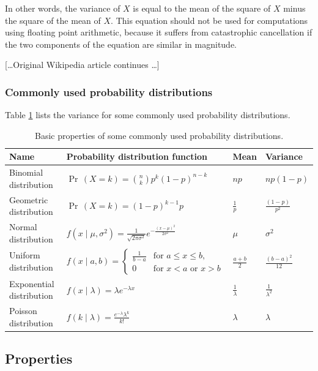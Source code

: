 In other words, the variance of $X$ is equal to the mean of the square of $X$
minus the square of the mean of $X$. This equation should not be used for
computations using floating point
arithmetic, because it suffers from catastrophic cancellation if the two
components of the equation are similar in magnitude. 

[\ldots Original Wikipedia article continues \ldots]

\subsubsection{Commonly used probability
distributions}\label{commonly_used_probability_distributions}

Table \ref{tab:var_dist} lists the variance for some commonly used
probability distributions.

\begin{table}[h]
\begin{tabular}{@{}llll@{}}
\toprule
Name  & Probability distribution function
& Mean & Variance \\
\midrule
Binomial distribution & $\Pr\,(X=k) = \binom{n}{k}p^k(1 - p)^{n-k}$ & $np$ & $np(1 - p)$ \\
Geometric distribution & $\Pr\,(X=k) = (1 - p)^{k-1}p$ & $\frac{1}{p}$ & $\frac{(1 - p)}{p^2}$ \\
Normal distribution &
$f\left(x \mid \mu, \sigma^2\right) = \frac{1}{\sqrt{2\pi\sigma^2}} e^{-\frac{(x - \mu)^2}{2\sigma^2}}$
& $\mu$ & $\sigma^2$ \\
Uniform distribution &
$f(x \mid a, b) = \begin{cases}
  \frac{1}{b - a} & \text{for } a \le x \le b, \\[3pt]
                0 & \text{for } x < a \text{ or } x > b
\end{cases}$ & $\frac{a + b}{2}$ & $\frac{(b - a)^2}{12}$ \\
Exponential distribution &
$f(x \mid \lambda) = \lambda e^{-\lambda x}$ & $\frac{1}{\lambda}$ &
$\frac{1}{\lambda^2}$ \\
Poisson distribution &
$f(k \mid \lambda) = \frac{e^{-\lambda}\lambda^{k}}{k!}$ & $\lambda$
  & $\lambda$ \\
  \bottomrule
\end{tabular}
\caption{\label{tab:var_dist} Basic properties of some commonly used probability distributions.}
\end{table}

\subsection{Properties}\label{properties}

